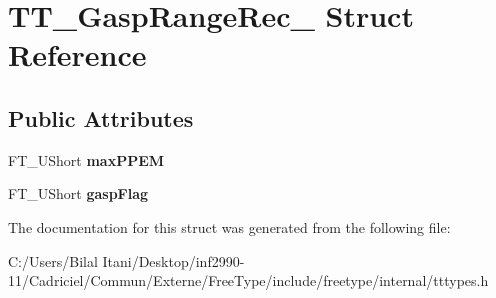 \hypertarget{struct_t_t___gasp_range_rec__}{}\section{T\+T\+\_\+\+Gasp\+Range\+Rec\+\_\+ Struct Reference}
\label{struct_t_t___gasp_range_rec__}
\subsection*{Public Attributes}
\begin{DoxyCompactItemize}
\item 
F\+T\+\_\+\+U\+Short {\bfseries max\+P\+P\+EM}\hypertarget{struct_t_t___gasp_range_rec___aa3fab31f6c0659b4deff402e210e15c9}{}\label{struct_t_t___gasp_range_rec___aa3fab31f6c0659b4deff402e210e15c9}

\item 
F\+T\+\_\+\+U\+Short {\bfseries gasp\+Flag}\hypertarget{struct_t_t___gasp_range_rec___a9fc298dc0e46d31507728ae25585118d}{}\label{struct_t_t___gasp_range_rec___a9fc298dc0e46d31507728ae25585118d}

\end{DoxyCompactItemize}


The documentation for this struct was generated from the following file\+:\begin{DoxyCompactItemize}
\item 
C\+:/\+Users/\+Bilal Itani/\+Desktop/inf2990-\/11/\+Cadriciel/\+Commun/\+Externe/\+Free\+Type/include/freetype/internal/tttypes.\+h\end{DoxyCompactItemize}
